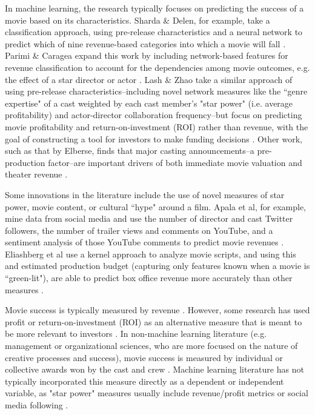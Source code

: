 \documentclass[12pt,english]{article}
\begin{document}
In machine learning, the research typically focuses on predicting the success of a movie based on its characteristics. Sharda \& Delen, for example, take a classification approach, using pre-release characteristics and a neural network to predict which of nine revenue-based categories into which a movie will fall \citep{sharda}. Parimi \& Caragea expand this work by including network-based features for revenue classification to account for the dependencies among movie outcomes, e.g. the effect of a star director or actor \citep{parimi}. Lash \& Zhao take a similar approach of using pre-release characteristics--including novel network measures like the ``genre expertise" of a cast weighted by each cast member's "star power" (i.e. average profitability) and actor-director collaboration frequency--but focus on predicting movie profitability and return-on-investment (ROI) rather than revenue, with the goal of constructing a tool for investors to make funding decisions \citep{lash}. Other work, such as that by Elberse, finds that major casting announcements--a pre-production factor--are important drivers of both immediate movie valuation and theater revenue \citep{elberse}. 

Some innovations in the literature include the use of novel measures of star power, movie content, or cultural ``hype" around a film. Apala et al, for example, mine data from social media and use the number of director and cast Twitter followers, the number of trailer views and comments on YouTube, and a sentiment analysis of those YouTube comments to predict movie revenues \citep{apala}. Eliashberg et al use a kernel approach to analyze movie scripts, and using this and estimated production budget (capturing only features known when a movie is ``green-lit"), are able to predict box office revenue more accurately than other measures \citep{eliashberg}. 

Movie success is typically measured by revenue \citep{apala, parimi, simonoff, gopinath, sharda, elberse, eliashberg}. However, some research has used profit or return-on-investment (ROI) as an alternative measure that is meant to be more relevant to investors \citep{lash}. In non-machine learning literature (e.g. management or organizational sciences, who are more focused on the nature of creative processes and success), movie success is measured by individual or collective awards won by the cast and crew \citep{cattani}. Machine learning literature has not typically incorporated this measure directly as a dependent or independent variable, as "star power" measures usually include revenue/profit metrics or social media following \citep{lash, sharda}. 
\end{document}
